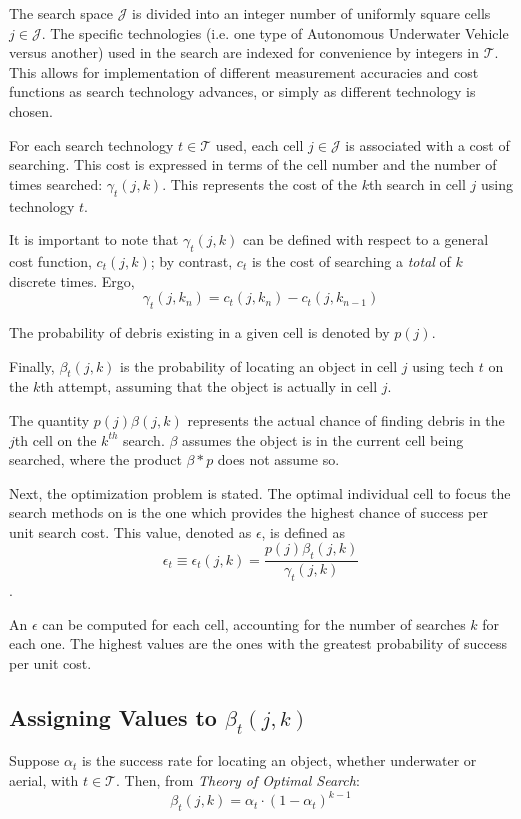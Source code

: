 \documentclass[a4paper]{article}
\begin{document}
The search space $\mathcal{J}$ is divided into an integer number of uniformly square cells $j\in\mathcal{J}$. The specific technologies (i.e. one type of Autonomous Underwater Vehicle versus another) used in the search are indexed for convenience by integers in $\mathcal{T}$. This allows for implementation of different measurement accuracies and cost functions as search technology advances, or simply as different technology is chosen. 

For each search technology $t\in\mathcal{T}$ used, each cell $j\in\mathcal{J}$ is associated with a cost of searching. This cost is expressed in terms of the cell number and the number of times searched: $\gamma_t(j,k)$. This represents the cost of the $k$th search in cell $j$ using technology $t$.

It is important to note that $\gamma_t(j,k)$ can be defined with respect to a general cost function, $c_t(j,k)$; by contrast, $c_t$ is the cost of searching  a \textit{total} of $k$ discrete times. Ergo, $$\gamma_t(j,k_n)=c_t(j,k_n)-c_t(j,k_{n-1})$$

The probability of debris existing in a given cell is denoted by $p(j)$.

Finally, $\beta_t(j,k)$ is the probability of locating an object in cell $j$ using tech $t$ on the $k$th attempt, assuming that the object is actually in cell $j$.

The quantity $p(j)\beta(j,k)$ represents the actual chance of finding debris in the $j$th cell on the $k^{th}$ search. $\beta$ assumes the object is in the current cell being searched, where the product $\beta * p$ does not assume so.

Next, the optimization problem is stated. The optimal individual cell to focus the search methods on is the one which provides the highest chance of success per unit search cost. This value, denoted as $\epsilon$, is defined as $$\epsilon_t\equiv\epsilon_t(j,k)=\frac{p(j)\beta_t(j,k)}{\gamma_t(j,k)}$$. 

An $\epsilon$ can be computed for each cell, accounting for the number of searches $k$ for each one. The highest values are the ones with the greatest probability of success per unit cost. 

\subsection{Assigning Values to $\beta_t(j,k)$}

Suppose $\alpha_t$ is the success rate for locating an object, whether underwater or aerial, with $t\in\mathcal{T}$. Then, from \textit{Theory of Optimal Search}: \[\beta_t(j,k)=\alpha_t\cdot(1-\alpha_t)^{k-1}\]
\end{document}
